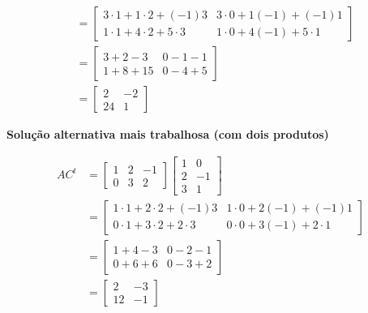 \documentclass[a4paper,12pt,fleqn]{article}
\begin{document}
\begin{answer}
\begin{align*}
    \\[2mm]
    & =
      \begin{bmatrix}
        3 \cdot 1 + 1 \cdot 2 + (-1) 3 &
        3 \cdot 0 + 1 (-1)    + (-1) 1
        \\
        1 \cdot 1 + 4 \cdot 2 +  5 \cdot 3 &
        1 \cdot 0 + 4 (-1)    +  5 \cdot 1
      \end{bmatrix}
    \\[2mm]
    & =
      \begin{bmatrix}
        3 + 2 -  3 & 0 - 1 - 1 \\
        1 + 8 + 15 & 0 - 4 + 5
      \end{bmatrix}
    \\[2mm]
    & =
      \begin{bmatrix}
        2 & -2 \\
        24 & 1
      \end{bmatrix}
  \end{align*}

  \clearpage
  \textbf{Solução alternativa mais trabalhosa (com dois produtos)}

  \begin{align*}
    AC^t
    & =
      \begin{bmatrix}
        1 & 2 & -1 \\
        0 & 3 &  2
      \end{bmatrix}
      \begin{bmatrix}
        1 &  0 \\
        2 & -1 \\
        3 &  1
      \end{bmatrix}
    \\[2mm]
    & =
      \begin{bmatrix}
        1 \cdot 1 + 2 \cdot 2 + (-1) 3 &
        1 \cdot 0 + 2 (-1)    + (-1) 1
        \\
        0 \cdot 1 + 3 \cdot 2 +  2 \cdot 3 &
        0 \cdot 0 + 3 (-1)    +  2 \cdot 1
      \end{bmatrix}
    \\[2mm]
    & =
      \begin{bmatrix}
        1 + 4 - 3 & 0 - 2 - 1 \\
        0 + 6 + 6 & 0 - 3 + 2
      \end{bmatrix}
    \\[2mm]
    & =
      \begin{bmatrix}
         2 & -3 \\
        12 & -1
      \end{bmatrix}
  \end{align*}


\end{answer}
\end{document}
